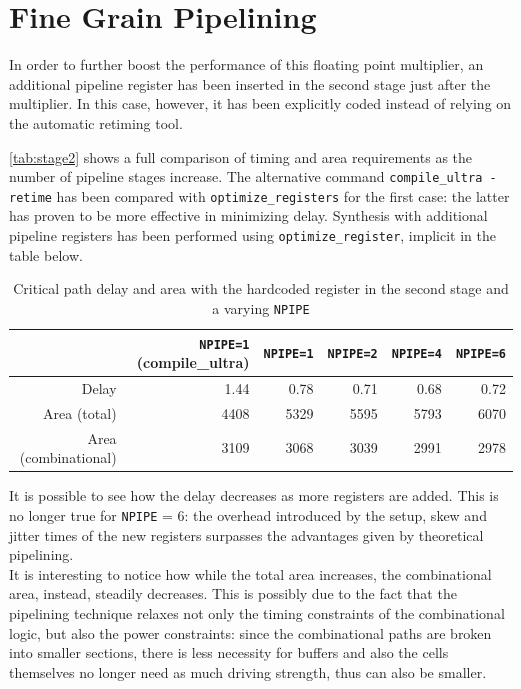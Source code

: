 \section{Fine Grain Pipelining}
In order to further boost the performance of this floating point multiplier, an additional pipeline register has been inserted in the second stage just after the multiplier. In this case, however, it has been explicitly coded instead of relying on the automatic retiming tool.

\autoref{tab:stage2} shows a full comparison of timing and area requirements as the number of pipeline stages increase. The alternative command \texttt{compile\_ultra -retime} has been compared with \texttt{optimize\_registers} for the first case: the latter has proven to be more effective in minimizing delay. Synthesis with additional pipeline registers has been performed using \texttt{optimize\_register}, implicit in the table below.

\begin{table}[htbp]
    \centering
	\begin{tabular}{|r|r|r|r|r|r|}
	\hline
	                       &\texttt{NPIPE=1} (compile\_ultra) &\texttt{NPIPE=1} & \texttt{NPIPE=2} & \texttt{NPIPE=4} & \texttt{NPIPE=6}\\\hline
	Delay                   & 1.44 & 0.78             & 0.71             & 0.68             & 0.72 \\\hline
    Area (total)           & 4408 & 5329             & 5595             & 5793             & 6070 \\\hline
    Area (combinational)    & 3109 & 3068             & 3039             & 2991             & 2978 \\\hline
	\end{tabular}
	\caption{Critical path delay and area with the hardcoded register in the second stage and a varying \texttt{NPIPE}}
	\label{tab:stage2}
\end{table}
It is possible to see how the delay decreases as more registers are added. This is no longer true for \texttt{NPIPE} = 6: the overhead introduced by the setup, skew and jitter times of the new registers surpasses the advantages given by theoretical pipelining.\\
It is interesting to notice how while the total area increases, the combinational area, instead, steadily decreases. This is possibly due to the fact that the pipelining technique relaxes not only the timing constraints of the combinational logic, but also the power constraints: since the combinational paths are broken into smaller sections, there is less necessity for buffers and also the cells themselves no longer need as much driving strength, thus can also be smaller.

